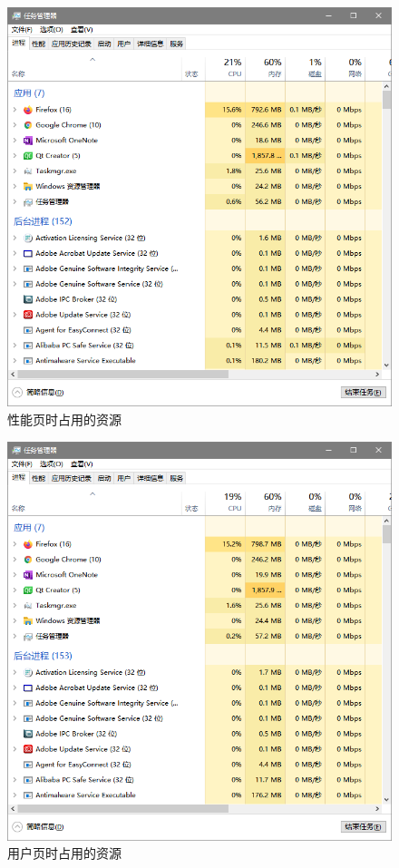 \documentclass[UTF8,twoside,titlepage]{ctexart}
\begin{document}
\begin{figure}[htbp]
    \centering
    \includegraphics[scale=0.75,viewport=0 290 701 356,clip]{../media/performance analyze/load perftab.png}
    \caption{性能页时占用的资源}
    \label{fig:perfanaly}
\end{figure}

\begin{figure}[htbp]
    \centering
    \includegraphics[scale=0.75,viewport=0 290 701 356,clip]{../media/performance analyze/load usertab.png}
    \caption{用户页时占用的资源}
    \label{fig:useranaly}
\end{figure}
\end{document}
